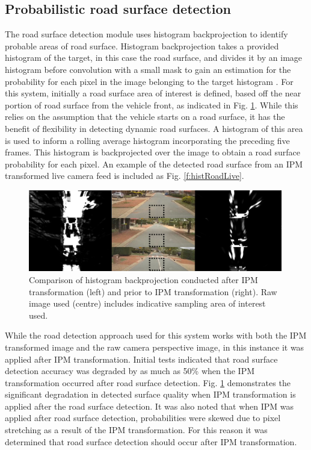 \documentclass[]{aiaa-tc}%
\begin{document}
\subsection{Probabilistic road surface detection}\label{s:histogramRoadDetection}

The road surface detection module uses histogram backprojection to identify probable areas of road surface. Histogram backprojection takes a provided histogram of the target, in this case the road surface, and divides it by an image histogram before convolution with a small mask to gain an estimation for the probability for each pixel in the image belonging to the target histogram \citep{histBackImageIndexing}. For this system, initially a road surface area of interest is defined, based off the near portion of road surface from the vehicle front, as indicated in Fig. \ref{f:histIPMcompare}. While this relies on the assumption that the vehicle starts on a road surface, it has the benefit of flexibility in detecting dynamic road surfaces. A histogram of this area is used to inform a rolling average histogram incorporating the preceding five frames. This histogram is backprojected over the image to obtain a road surface probability for each pixel. An example of the detected road surface from an IPM transformed live camera feed is included as Fig. \ref{f:histRoadLive}. 

\begin{figure}
	\includegraphics[width=0.99\textwidth]{RoadDetection/histIPMcompare.png}
	\caption{Comparison of histogram backprojection conducted after IPM transformation (left) and prior to IPM transformation (right). Raw image used (centre) includes indicative sampling area of interest used.}
	\label{f:histIPMcompare}
\end{figure}

While the road detection approach used for this system works with both the IPM transformed image and the raw camera perspective image, in this instance it was applied after IPM transformation. Initial tests indicated that road surface detection accuracy was degraded by as much as 50\% when the IPM transformation occurred after road surface detection. Fig. \ref{f:histIPMcompare} demonstrates the significant degradation in detected surface quality when IPM transformation is applied after the road surface detection. It was also noted that when IPM was applied after road surface detection, probabilities were skewed due to pixel stretching as a result of the IPM transformation. For this reason it was determined that road surface detection should occur after IPM transformation.
\end{document}
